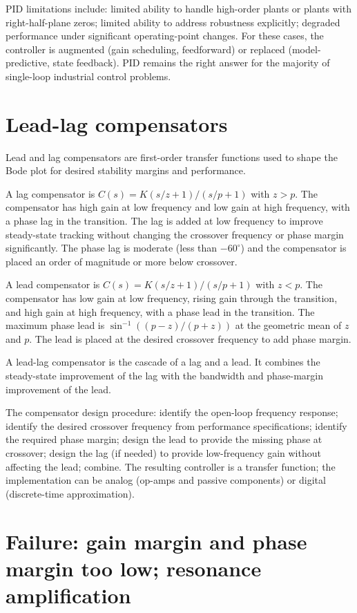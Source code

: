 PID limitations include: limited ability to handle high-order plants or plants with right-half-plane zeros; limited ability to address robustness explicitly; degraded performance under significant operating-point changes. For these cases, the controller is augmented (gain scheduling, feedforward) or replaced (model-predictive, state feedback). PID remains the right answer for the majority of single-loop industrial control problems.

\section{Lead-lag compensators}

Lead and lag compensators are first-order transfer functions used to shape the Bode plot for desired stability margins and performance.

A lag compensator is $C(s) = K (s/z + 1)/(s/p + 1)$ with $z > p$. The compensator has high gain at low frequency and low gain at high frequency, with a phase lag in the transition. The lag is added at low frequency to improve steady-state tracking without changing the crossover frequency or phase margin significantly. The phase lag is moderate (less than $-60^\circ$) and the compensator is placed an order of magnitude or more below crossover.

A lead compensator is $C(s) = K (s/z + 1)/(s/p + 1)$ with $z < p$. The compensator has low gain at low frequency, rising gain through the transition, and high gain at high frequency, with a phase lead in the transition. The maximum phase lead is $\sin^{-1}((p-z)/(p+z))$ at the geometric mean of $z$ and $p$. The lead is placed at the desired crossover frequency to add phase margin.

A lead-lag compensator is the cascade of a lag and a lead. It combines the steady-state improvement of the lag with the bandwidth and phase-margin improvement of the lead.

The compensator design procedure: identify the open-loop frequency response; identify the desired crossover frequency from performance specifications; identify the required phase margin; design the lead to provide the missing phase at crossover; design the lag (if needed) to provide low-frequency gain without affecting the lead; combine. The resulting controller is a transfer function; the implementation can be analog (op-amps and passive components) or digital (discrete-time approximation).

\section{Failure: gain margin and phase margin too low; resonance amplification}

